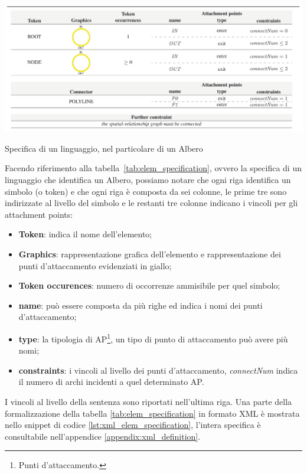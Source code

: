         \begin{table}[htbp]
            \centering
            \includegraphics[scale=0.35]{Figure/elem_specification.PNG}
            \caption{Specifica di un linguaggio, nel particolare di un Albero}
            \label{tab:elem_specification}
        \end{table}
        \noindent
        Facendo riferimento alla tabella~\ref{tab:elem_specification}, ovvero la specifica di un linguaggio che identifica un Albero, possiamo notare che ogni riga identifica un simbolo (o token) e che ogni riga è composta da sei colonne, le prime tre sono indirizzate al livello del simbolo e le restanti tre colonne indicano i vincoli per gli attachment points:
        \begin{itemize}
            \item \textbf{Token}: indica il nome dell'elemento;
            \item \textbf{Graphics}: rappresentazione grafica dell'elemento e rappresentazione dei punti d'attaccamento evidenziati in giallo;
            \item \textbf{Token occurences}: numero di occorrenze ammisibile per quel simbolo;
            \item \textbf{name}: può essere composta da più righe ed indica i nomi dei punti d'attaccamento;
            \item \textbf{type}: la tipologia di AP\footnote{Punti d'attaccamento.}, un tipo di punto di attaccamento può avere più nomi;
            \item \textbf{constraints}: i vincoli al livello dei punti d'attaccamento, \textit{connectNum} indica il numero di archi incidenti a quel determinato AP.
        \end{itemize}
        I vincoli al livello della sentenza sono riportati nell'ultima riga. Una parte della formalizzazione della tabella \ref{tab:elem_specification} in formato XML è mostrata nello snippet di codice \ref{lst:xml_elem_specification}, l'intera specifica è consultabile nell'appendice \ref{appendix:xml_definition}.

